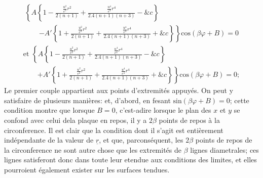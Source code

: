 \documentclass[11pt,a4paper]{article}
\begin{document}
\[ \begin{array}{l} \left\{A\left\{1 - \frac{\frac{u^2}{e^2}r^2}{2(n+1)} + \frac{\frac{u^4}{e^4}r^4}{2.4(n+1)(n+3)} - \&c\right\}\right. \\ \qquad \left. - A'\left\{1 + \frac{\frac{u^2}{e^2}r^2}{2(n+1)} + \frac{\frac{u^4}{e^4}r^4}{2.4(n+1)(n+3)} + \&c\right\}\right\}\text{cos}(\beta\varphi + B) = 0 \end{array} \]
\[ \begin{array}{l} \text{et }\left\{A\left\{1 - \frac{\frac{u^2}{e^2}r^2}{2(n+1)} + \frac{\frac{u^4}{e^4}r^4}{2.4(n+1)(n+3)} - \&c\right\}\right. \\ \qquad \left. + A'\left\{1 + \frac{\frac{u^2}{e^2}r^2}{2(n+1)} + \frac{\frac{u^4}{e^4}r^4}{2.4(n+1)(n+3)} + \&c\right\}\right\}\text{cos}(\beta\varphi + B) = 0; \end{array} \]
Le premier couple appartient aux points d'extremités appuyés.
On peut y satisfaire de plusieurs manières: et, d'abord, en
fesant $\text{sin}(\beta\varphi + B) = 0$; cette condition montre que lorsque $B = 0$,
c'est-adire lorsque le plan des $x$ et $y$ se confond avec
celui dela plaque en repos, il y a $2\beta$ points de repos à la
circonference. Il est clair que la condition dont il s'agit
est entièrement indépendante de la valeur de $\underline{r}$, et que, parconséquent,
les $2\beta$ points de repos de la circonference ne sont autre chose
que les extremités de $\beta$ lignes   diametrales; 
ces lignes satisferont donc dans toute leur etendue aux conditions
des limites, et elles pourroient également exister sur les surfaces tendues.
\end{document}
